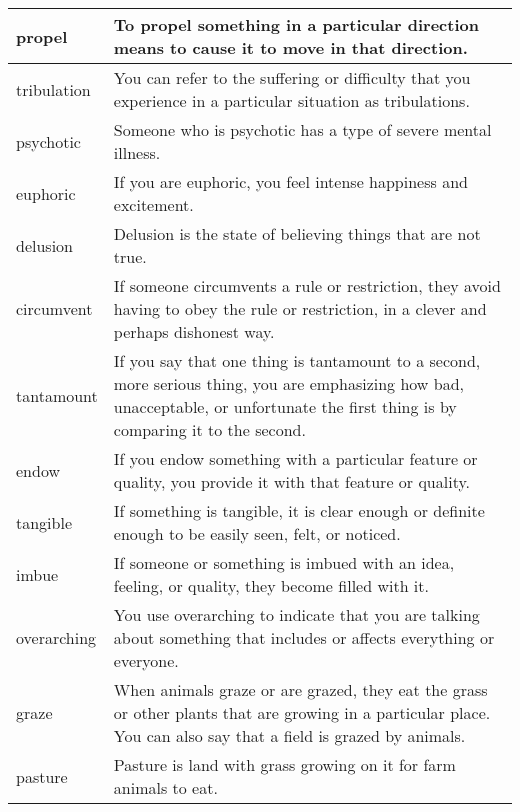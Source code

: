 \documentclass{article}
\begin{document}
\begin{center}
\begin{longtable}{|l|p{7.8cm}|}
\hline
propel
&
To propel something in a particular direction means to cause it to move in that direction.
\\

\hline
tribulation
&
You can refer to the suffering or difficulty that you experience in a particular situation as tribulations.
\\

\hline
psychotic
&
Someone who is psychotic has a type of severe mental illness.
\\

\hline
euphoric
&
If you are euphoric, you feel intense happiness and excitement.
\\

\hline
delusion
&
Delusion is the state of believing things that are not true.
\\

\hline
circumvent
&
If someone circumvents a rule or restriction, they avoid having to obey the rule or restriction, in a clever and perhaps dishonest way.
\\

\hline
tantamount
&
If you say that one thing is tantamount to a second, more serious thing, you are emphasizing how bad, unacceptable, or unfortunate the first thing is by comparing it to the second.
\\

\hline
endow
&
If you endow something with a particular feature or quality, you provide it with that feature or quality.
\\

\hline
tangible
&
If something is tangible, it is clear enough or definite enough to be easily seen, felt, or noticed.
\\

\hline
imbue
&
If someone or something is imbued with an idea, feeling, or quality, they become filled with it.
\\

\hline
overarching
&
You use overarching to indicate that you are talking about something that includes or affects everything or everyone.
\\

\hline
graze
&
When animals graze or are grazed, they eat the grass or other plants that are growing in a particular place. You can also say that a field is grazed by animals.
\\

\hline
pasture
&
Pasture is land with grass growing on it for farm animals to eat.
\\


\end{longtable}
\end{center}
\end{document}

